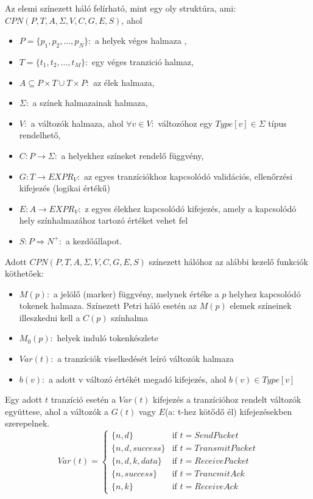 Az elemi színezett háló felírható, mint egy oly struktúra, ami: $CPN(P,T,A,\Sigma ,V,C,G,E,S)$, ahol 
\begin{itemize}
\item $P=\{ p_1,p_2,\ldots ,p_N \}:$ a helyek véges halmaza ,
\item $T=\{ t_1,t_2,\ldots ,t_M\}:$ egy véges tranzició halmaz,
\item $A \subseteq P\times T \cup T\times P:$ az élek halmaza,
\item $\Sigma:$ a színek halmazainak halmaza, 
\item $V:$ a változók halmaza, ahol $\forall v\in V:$ változóhoz egy $Type[v] \in \Sigma $ típus rendelhető,
\item $C: P\rightarrow \Sigma :$ a helyekhez színeket rendelő függvény,
\item $G: T\rightarrow EXPR_V:$ az egyes tranzíciókhoz kapcsolódó validációs, ellenőrzési kifejezés (logikai értékű)
\item $E: A\rightarrow EXPR_V:$ z  egyes élekhez kapcsolódó kifejezés, amely a kapcsolódó hely színhalmazához tartozó értéket vehet fel
\item $S: P\Rightarrow N^+:$ a kezdőállapot.
\end{itemize}

Adott $CPN(P,T,A,\Sigma ,V,C,G,E,S)$ színezett hálóhoz az alábbi kezelő funkciók köthetőek: 
\begin{itemize}
\item $M(p):$ a jelölő (marker) függvény, melynek értéke a $p$ helyhez kapcsolódó tokenek halmaza. Színezett Petri háló esetén az $M(p)$ elemek színeinek illeszkedni kell a $C(p)$ színhalma
\item $M_0(p):$  helyek induló tokenkészlete
\item $Var(t):$ a tranzíciók viselkedését leíró változók halmaza
\item $b(v):$ a adott v változó értékét megadó kifejezés, ahol $b(v) \in Type[v]$
\end{itemize}

Egy adott $t$ tranzíció esetén a $Var(t)$ kifejezés a tranzícióhoz rendelt változók együttese, ahol a változók a $G(t)$ vagy $E$(a: t-hez kötődő él) kifejezésekben szerepelnek.
\begin{equation*}
Var(t)=\begin{cases}
\{n,d\} &\text{if } t=SendPacket\\
\{n,d,success\} &\text{if } t= TransmitPacket\\
\{n,d,k,data\} &\text{if } t=ReceivePacket\\
\{n,success\} &\text{if } t=TrancmitAck\\
\{n,k\} &\text{if }t=ReceiveAck
\end{cases}
\end{equation*}

